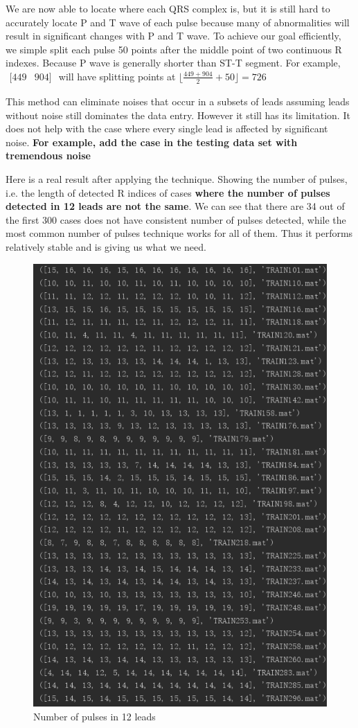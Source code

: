 \documentclass[%
 reprint,
 amsmath,amssymb,
 aps,
]{revtex4-2}
\begin{document}
We are now able to locate where each QRS complex is, but it is still hard to accurately locate P and T wave of each pulse because many of abnormalities will result in significant changes with P and T wave. To achieve our goal efficiently, we simple split each pulse 50 points after the middle point of two continuous R indexes. Because P wave is generally shorter than ST-T segment. For example, $\begin{matrix}
[449&904]
\end{matrix}$ will have splitting points at $\lfloor \frac{449 + 904}{2} + 50\rfloor = 726$ 

This method can eliminate noises that occur in a subsets of leads assuming leads without noise still dominates the data entry. However it still has its limitation. It does not help with the case where every single lead is affected by significant noise. \textbf{For example, add the case in the testing data set with tremendous noise}

Here is a real result after applying the technique. Showing the number of pulses, i.e. the length of detected R indices of cases \textbf{where the number of pulses detected in 12 leads are not the same}. We can see that there are 34 out of the first 300 cases does not have consistent number of pulses detected, while the most common number of pulses technique works for all of them. Thus it performs relatively stable and is giving us what we need.

\begin{figure}[H]
	\includegraphics[width=0.8\linewidth]{img/pulse_num.png}
	\caption{\label{fig:pulse_num} Number of pulses in 12 leads}
\end{figure}
\end{document}

